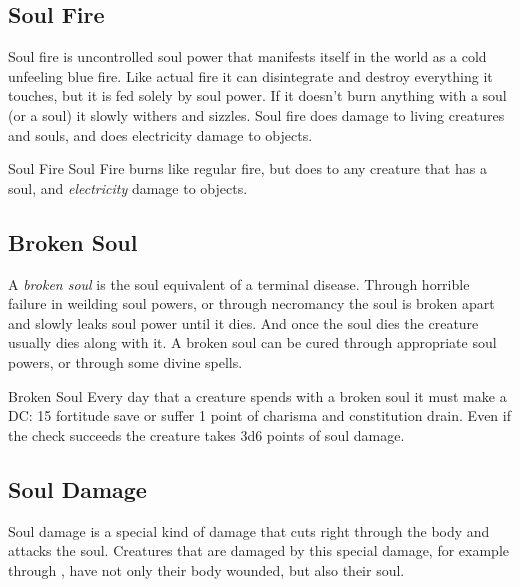 \subsection{Soul Fire}
\label{sec:Soul Fire}

Soul fire is uncontrolled soul power that manifests itself in the world as a
cold unfeeling blue fire. Like actual fire it can disintegrate and destroy
everything it touches, but it is fed solely by soul power. If it doesn't burn
anything with a soul (or a soul) it slowly withers and sizzles. Soul fire does
damage to living creatures and souls, and does electricity damage to objects.

\begin{35e}{Soul Fire}
  Soul Fire burns like regular fire, but does  to any
  creature that has a soul, and \emph{electricity} damage to objects.
\end{35e}

\subsection{Broken Soul}
\label{sec:Broken Soul}


A \emph{broken soul} is the soul equivalent of a terminal disease. Through
horrible failure in weilding soul powers, or through necromancy the soul is
broken apart and slowly leaks soul power until it dies. And once the soul dies
the creature usually dies along with it. A broken soul can be cured through
appropriate soul powers, or through some divine spells.

\begin{35e}{Broken Soul}
  Every day that a creature spends with a broken soul it must make a DC: 15
  fortitude save or suffer 1 point of charisma and constitution drain. Even if
  the check succeeds the creature takes 3d6 points of soul damage.
\end{35e}

\subsection{Soul Damage}
\label{sec:Soul Damage}

Soul damage is a special kind of damage that cuts right through the body and
attacks the soul. Creatures that are damaged by this special damage, for
example through , have not only their body wounded,
but also their soul.

